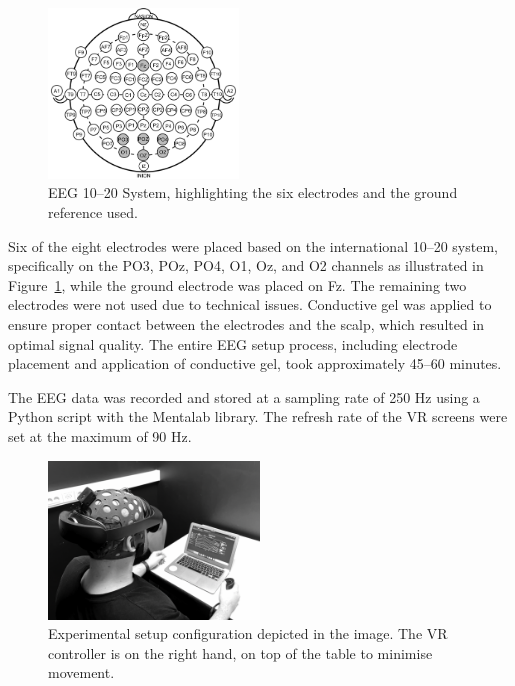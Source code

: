 \begin{figure}[ht]
    \centering
    \includegraphics[width=0.45\textwidth]{images/methods/EEG-1020.png}
    \caption{EEG 10--20 System, highlighting the six electrodes and the ground reference used.}\label{fig:EEG-1020}
\end{figure}

Six of the eight electrodes were placed based on the international 10--20 system, specifically on the PO3, POz, PO4, O1, Oz, and O2 channels as illustrated in Figure~\ref{fig:EEG-1020}, while the ground electrode was placed on Fz. The remaining two electrodes were not used due to technical issues. Conductive gel was applied to ensure proper contact between the electrodes and the scalp, which resulted in optimal signal quality. The entire EEG setup process, including electrode placement and application of conductive gel, took approximately 45--60 minutes.

The EEG data was recorded and stored at a sampling rate of 250 Hz using a Python script with the Mentalab library. The refresh rate of the VR screens were set at the maximum of 90 Hz.

\begin{figure}[ht]
    \centering
    \includegraphics[width=0.5\textwidth]{images/experiments/experiment_setup.png}
    \caption{Experimental setup configuration depicted in the image. The VR controller is on the right hand, on top of the table to minimise movement.}\label{fig:mentalab}
\end{figure}

